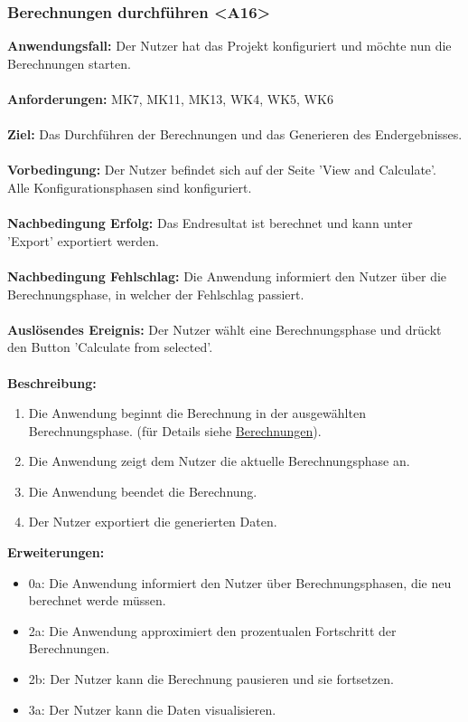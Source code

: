 \documentclass[parskip=full]{scrartcl} %
\begin{document}
\subsubsection*{Berechnungen durchführen <A16>}
\textbf{Anwendungsfall:} Der Nutzer hat das Projekt konfiguriert und möchte nun die Berechnungen starten.\\\\
\textbf{Anforderungen:} MK7, MK11, MK13, WK4, WK5, WK6\\\\
\textbf{Ziel:} Das Durchführen der Berechnungen und das Generieren des Endergebnisses.\\\\
\textbf{Vorbedingung:} Der Nutzer befindet sich auf der Seite 'View and Calculate'. Alle Konfigurationsphasen sind konfiguriert.\\\\
\textbf{Nachbedingung Erfolg:} Das Endresultat ist berechnet und kann unter 'Export' exportiert werden. \\\\
\textbf{Nachbedingung Fehlschlag:} Die Anwendung informiert den Nutzer über die Berechnungsphase, in welcher der Fehlschlag passiert. \\\\
\textbf{Auslösendes Ereignis:} Der Nutzer wählt eine Berechnungsphase und drückt den Button 'Calculate from selected'.\\\\
\textbf{Beschreibung:}
\begin{enumerate}
    \item Die Anwendung beginnt die Berechnung in der ausgewählten Berechnungsphase. (für Details siehe \hyperlink{calculations}{Berechnungen}).
    \item Die Anwendung zeigt dem Nutzer die aktuelle Berechnungsphase an.
    \item Die Anwendung beendet die Berechnung.
    \item Der Nutzer exportiert die generierten Daten.
\end{enumerate}
\textbf{Erweiterungen:} 
\begin{itemize}
    \item 0a: Die Anwendung informiert den Nutzer über Berechnungsphasen, die neu berechnet werde müssen.
    \item 2a: Die Anwendung approximiert den prozentualen Fortschritt der Berechnungen.
    \item 2b: Der Nutzer kann die Berechnung pausieren und sie fortsetzen.
    \item 3a: Der Nutzer kann die Daten visualisieren.
\end{itemize}
\newpage
\end{document}
